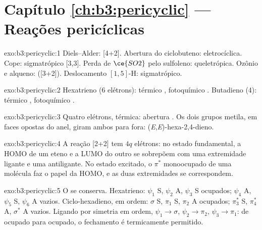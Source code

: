 \section*{Capítulo \ref{ch:b3:pericyclic} --- Reações pericíclicas}

\begin{solution}{exo:b3:pericyclic:1}
Diels--Alder:  [4+2]. Abertura do ciclobuteno: eletrocíclica. Cope: sigmatrópico
[3,3]. Perda de $\ce{SO2}$ pelo sulfoleno: queletrópica. Ozônio e alqueno: 
([3+2]). Deslocamento $[1,5]$-H: sigmatrópico.
\end{solution}

\begin{solution}{exo:b3:pericyclic:2}
Hexatrieno (6 elétrons): térmico , fotoquímico .
Butadieno (4): térmico , fotoquímico .
\end{solution}

\begin{solution}{exo:b3:pericyclic:3}
Quatro elétrons, térmica: abertura . Os dois grupos metila, em faces opostas
do anel, giram ambos para fora: (\textit{E},\textit{E})-hexa-2,4-dieno.
\end{solution}

\begin{solution}{exo:b3:pericyclic:4}
A reação [2+2]  tem $4q$ elétrons: no estado fundamental, a HOMO de um
eteno e a LUMO do outro se sobrepõem com uma extremidade ligante e uma antiligante.
No estado excitado, o $\pi^*$ monoocupado de uma molécula faz o papel da
HOMO, e as duas extremidades se correspondem.
\end{solution}

\begin{solution}{exo:b3:pericyclic:5}
O  se conserva. Hexatrieno: $\psi_1$ S, $\psi_2$ A, $\psi_3$ S ocupados; $\psi_4$ A, $\psi_5$ S, $\psi_6$ A vazios.
Ciclo-hexadieno, em ordem: $\sigma$ S, $\pi_1$ S, $\pi_2$ A ocupados; $\pi_3^*$ S, $\pi_4^*$ A, $\sigma^*$ A vazios. Ligando por
simetria em ordem, $\psi_1 \to \sigma$, $\psi_2 \to \pi_2$, $\psi_3 \to \pi_1$: de ocupado para ocupado, o fechamento 
é termicamente permitido.
\end{solution}

